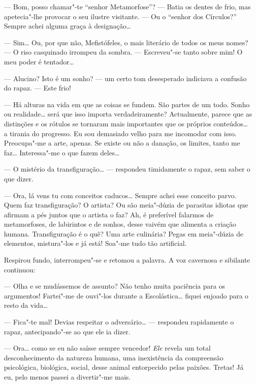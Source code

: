 --- Bom, posso chamar"-te ``senhor Metamorfose''? ---  Batia os dentes de frio,
mas apetecia"-lhe provocar o seu ilustre visitante. --- Ou o ``senhor dos
Círculos?'' Sempre achei alguma graça à designação\ldots{}

--- Sim\ldots{} Ou, por que não, Mefistófeles, o mais literário de todos os
meus nomes? --- O riso casquinado irrompeu da sombra. --- Escreveu"-se tanto
sobre mim! O meu poder é tentador\ldots{}

--- Alucino? Isto é um sonho? --- um certo tom desesperado indiciava a
confusão do rapaz. --- Este frio!

--- Há alturas na vida em que as coisas se fundem. São partes de um todo.
Sonho ou realidade\ldots{} será que isso importa verdadeiramente?
Actualmente, parece que as distinções e os rótulos se tornaram mais
importantes que os próprios conteúdos\ldots{} a tirania do progresso. Eu sou
demasiado velho para me incomodar com isso. Preocupa"-me a arte, apenas.
Se existe ou não a danação, os limites, tanto me faz\ldots{} Interessa"-me o
que fazem deles\ldots{}

--- O mistério da transfiguração\ldots{} --- respondeu timidamente o rapaz, sem
saber o que dizer.

--- Ora, lá vens tu com conceitos caducos\ldots{} Sempre achei esse conceito
parvo. Quem faz transfiguração? O artista? Ou são meia"-dúzia de
parasitas idiotas que afirmam a pés juntos que o artista o faz? Ah, é
preferível falarmos de metamorfoses, de labirintos e de sonhos, desse
vaivém que alimenta a criação humana. Transfiguração é o quê? Uma arte
culinária? Pegas em meia"-dúzia de elementos, mistura"-los e já está!
Soa"-me tudo tão artificial.

Respirou fundo, interrompeu"-se e retomou a palavra. A voz cavernosa e
sibilante continuou:

--- Olha e se mudássemos de assunto? Não tenho muita paciência para os
argumentos! Fartei"-me de ouvi"-los durante a Escolástica\ldots{} fiquei
enjoado para o resto da vida\ldots{}

--- Fica"-te mal! Devias respeitar o adversário\ldots{} --- respondeu rapidamente
o rapaz, antecipando"-se ao que ele ia dizer.

--- Ora\ldots{} como se eu não saísse sempre vencedor! \emph{Ele} revela um
total desconhecimento da natureza humana, uma inexistência da
compreensão psicológica, biológica, social, desse animal entorpecido
pelas paixões. Tretas! Já eu, pelo menos passei a divertir"-me mais.

